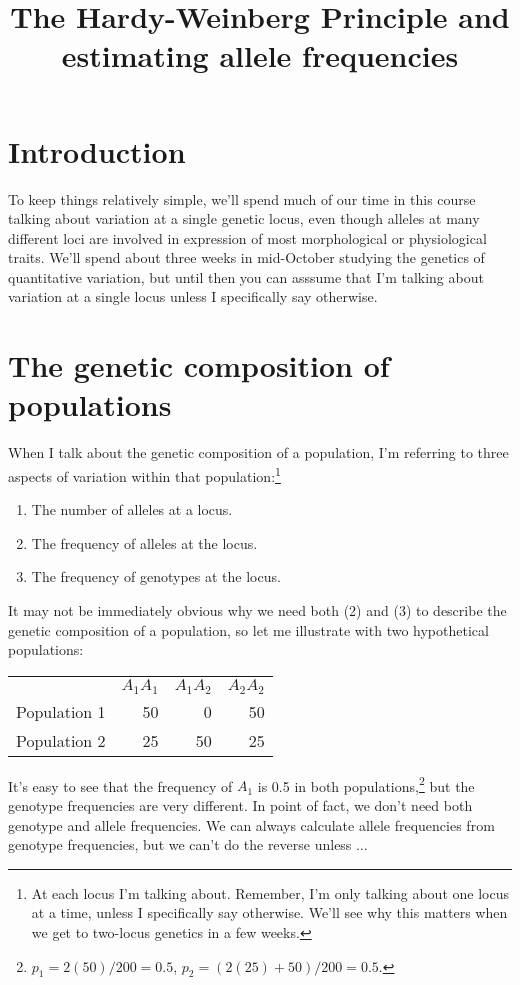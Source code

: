 \documentclass[12pt]{article}
\title{The Hardy-Weinberg Principle and estimating allele frequencies}
\begin{document}
\maketitle

\thispagestyle{first}

\section*{Introduction}

To keep things relatively simple, we'll spend much of our time in this
course talking about variation at a single genetic locus, even though
alleles at many different loci are involved in expression of most
morphological or physiological traits. We'll spend about three weeks
in mid-October studying the genetics of quantitative variation, but
until then you can asssume that I'm talking about variation at a
single locus unless I specifically say otherwise.

\section*{The genetic composition of populations}

When I talk about the genetic composition of a population, I'm
referring to three aspects of variation within that
population:\footnote{At each locus I'm talking about. Remember, I'm
  only talking about one locus at a time, unless I specifically say
  otherwise. We'll see why this matters when we get to two-locus
  genetics in a few weeks.}
\begin{enumerate}

\item The number of alleles at a locus.

\item The frequency of alleles at the locus.

\item The frequency of genotypes at the locus.

\end{enumerate}
It may not be immediately obvious why we need both (2) and
(3) to describe the genetic composition of a population, so let me
illustrate with two hypothetical populations:
\begin{center}
\begin{tabular}{lrrr}
             & $A_1A_1$ & $A_1A_2$ & $A_2A_2$ \\
Population 1 &       50 &        0 &       50 \\
Population 2 &       25 &       50 &       25 \\
\end{tabular}
\end{center}
It's easy to see that the frequency of $A_1$ is 0.5 in both
populations,\footnote{$p_1 = 2(50)/200 = 0.5$, $p_2 = (2(25) + 50)/200
= 0.5$.} but the genotype frequencies are very different. In point of
fact, we don't need both genotype and allele frequencies. We can
always calculate allele frequencies from genotype frequencies, but we
can't do the reverse unless $\dots$
\end{document}
